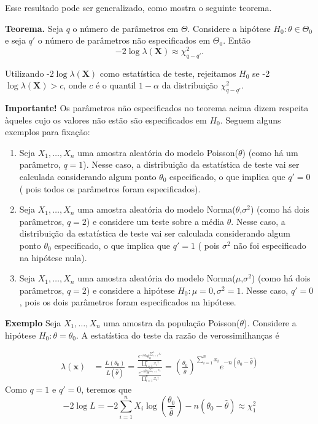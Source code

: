 \documentclass[
  letterpaper,
  DIV=11,
  numbers=noendperiod]{scrartcl}
\begin{document}
Esse resultado pode ser generalizado, como mostra o seguinte teorema.

\textbf{Teorema.} Seja \(q\) o número de parâmetros em \(\Theta\).
Considere a hipótese \(H_0:\theta\in\Theta_0\) e seja \(q'\) o número de
parâmetros não especificados em \(\Theta_0\). Então
\[-2\log \lambda(\textbf{X})\approx \chi^2_{q-q'}.\]

Utilizando -2\(\log \lambda(\textbf{X})\) como estatística de teste,
rejeitamos \(H_0\) se -2\(\log \lambda(\textbf{X})>c\), onde \(c\) é o
quantil \(1-\alpha\) da distribuição \(\chi^2_{q-q'}\).

\textbf{Importante!} Os parâmetros não especificados no teorema acima
dizem respeita àqueles cujo os valores não estão são especificados em
\(H_0\). Seguem alguns exemplos para fixação:

\begin{enumerate}
\def\labelenumi{\arabic{enumi}.}
\item
  Seja \(X_1,\ldots,X_n\) uma amostra aleatória do modelo
  Poisson(\(\theta\)) (como há um parâmetro, \(q=1\)). Nesse caso, a
  distribuição da estatística de teste vai ser calculada considerando
  algum ponto \(\theta_0\) especificado, o que implica que \(q'=0\) (
  pois todos os parâmetros foram especificados).
\item
  Seja \(X_1,\ldots,X_n\) uma amostra aleatória do modelo
  Norma(\(\theta\),\(\sigma^2\)) (como há dois parâmetros, \(q=2\)) e
  considere um teste sobre a média \(\theta\). Nesse caso, a
  distribuição da estatística de teste vai ser calculada considerando
  algum ponto \(\theta_0\) especificado, o que implica que \(q'=1\) (
  pois \(\sigma^2\) não foi especificado na hipótese nula).
\item
  Seja \(X_1,\ldots,X_n\) uma amostra aleatória do modelo
  Norma(\(\mu\),\(\sigma^2\)) (como há dois parâmetros, \(q=2\)) e
  considere a hipótese \(H_0:\mu=0,\sigma^2=1\). Nesse caso, \(q'=0\),
  pois os dois parâmetros foram especificados na hipótese.
\end{enumerate}

\textbf{Exemplo} Seja \(X_1,\ldots,X_n\) uma amostra da população
Poisson(\(\theta\)). Considere a hipótese \(H_0:\theta=\theta_0\). A
estatística do teste da razão de verossimilhanças é

\[\begin{align}\lambda(\textbf{x})&=\frac{L(\theta_0)}{L(\hat{\theta})}=\frac{\frac{e^{-n\theta_0}\theta_0^{\sum_{i=1}^n x_i}}{\prod_{i=1}^n x_i!}}{\frac{e^{-n\hat{\theta}}\hat{\theta}^{\sum_{i=1}^n x_i}}{\prod_{i=1}^n x_i!}}=\left(\frac{\theta_0}{\hat{\theta}}\right)^{\sum_{i=1}^n x_i}e^{-n(\theta_0-\hat{\theta})}\end{align}\]
Como \(q=1\) e \(q'=0\), teremos que
\[-2\log L=-2\sum_{i=1}^n X_i\log\left(\frac{\theta_0}{\hat{\theta}}\right)-n(\theta_0-\hat{\theta})\approx \chi^2_1\]
\end{document}
